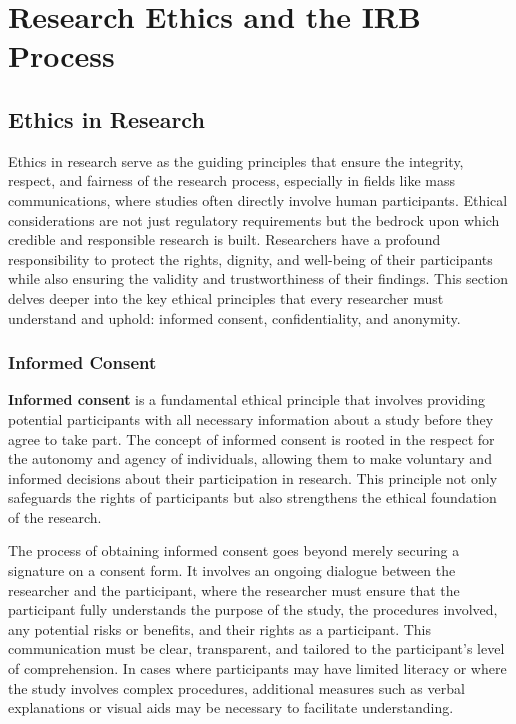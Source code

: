 \documentclass[
]{book}
\begin{document}
\chapter{Research Ethics and the IRB Process}\label{research-ethics-and-the-irb-process}

\section{Ethics in Research}\label{ethics-in-research}

Ethics in research serve as the guiding principles that ensure the integrity, respect, and fairness of the research process, especially in fields like mass communications, where studies often directly involve human participants. Ethical considerations are not just regulatory requirements but the bedrock upon which credible and responsible research is built. Researchers have a profound responsibility to protect the rights, dignity, and well-being of their participants while also ensuring the validity and trustworthiness of their findings. This section delves deeper into the key ethical principles that every researcher must understand and uphold: informed consent, confidentiality, and anonymity.

\subsection*{Informed Consent}\label{informed-consent}

\textbf{Informed consent} is a fundamental ethical principle that involves providing potential participants with all necessary information about a study before they agree to take part. The concept of informed consent is rooted in the respect for the autonomy and agency of individuals, allowing them to make voluntary and informed decisions about their participation in research. This principle not only safeguards the rights of participants but also strengthens the ethical foundation of the research.

The process of obtaining informed consent goes beyond merely securing a signature on a consent form. It involves an ongoing dialogue between the researcher and the participant, where the researcher must ensure that the participant fully understands the purpose of the study, the procedures involved, any potential risks or benefits, and their rights as a participant. This communication must be clear, transparent, and tailored to the participant's level of comprehension. In cases where participants may have limited literacy or where the study involves complex procedures, additional measures such as verbal explanations or visual aids may be necessary to facilitate understanding.
\end{document}
